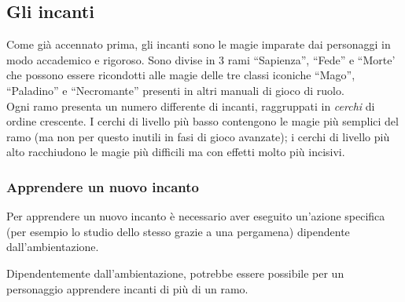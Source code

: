\documentclass[../manuale_main.tex]{subfiles}
\begin{document}
\subsection{Gli incanti}
Come già accennato prima, gli incanti sono le magie imparate dai personaggi in modo accademico e rigoroso.
Sono divise in 3 rami ``Sapienza'', ``Fede'' e ``Morte' che possono essere ricondotti alle magie delle tre classi iconiche ``Mago'', ``Paladino'' e ``Necromante'' presenti in altri manuali di gioco di ruolo.\\
Ogni ramo presenta un numero differente di incanti, raggruppati in \emph{cerchi} di ordine crescente. I cerchi di livello più basso contengono le magie più semplici del ramo (ma non per questo inutili in fasi di gioco avanzate); i cerchi di livello più alto racchiudono le magie più difficili ma con effetti molto più incisivi.



\subsubsection{Apprendere un nuovo incanto}
Per apprendere un nuovo incanto è necessario aver eseguito un'azione specifica (per esempio lo studio dello stesso grazie a una pergamena) dipendente dall'ambientazione.

Dipendentemente dall'ambientazione, potrebbe essere possibile per un personaggio apprendere incanti di più di un ramo.
\clearpage


\clearpage


\clearpage


\clearpage

\end{document}
